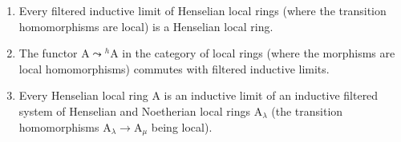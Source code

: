 \begin{proposition}[18.6.14]
\label{IV.18.6.14}
\begin{enumerate}[label=\emph{\roman*)}]
  \item Every filtered inductive limit of Henselian local rings (where the transition homomorphisms are local) is a Henselian local ring.
  \item The functor $\mathrm{A}\leadsto{}^h\!\mathrm{A}$ in the category of local rings (where the morphisms are local homomorphisms) commutes with filtered inductive limits.
  \item Every Henselian local ring A is an inductive limit of an inductive filtered system of Henselian and Noetherian local rings $\mathrm{A}_\lambda$ (the transition homomorphisms $\mathrm{A}_\lambda\to\mathrm{A}_\mu$ being local).
\end{enumerate}
\end{proposition}

